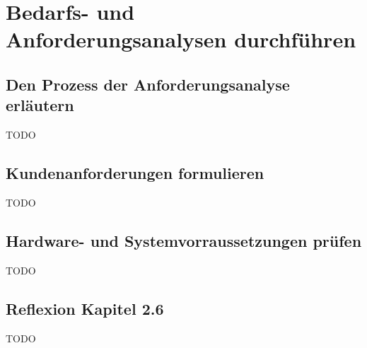 \section{Bedarfs- und Anforderungsanalysen durchführen}
\subsection{Den Prozess der Anforderungsanalyse erläutern}
    TODO
\subsection{Kundenanforderungen formulieren}
    TODO
\subsection{Hardware- und Systemvorraussetzungen prüfen}
    TODO
\subsection*{Reflexion Kapitel 2.6}
    \begin{refindent}
        TODO
    \end{refindent}